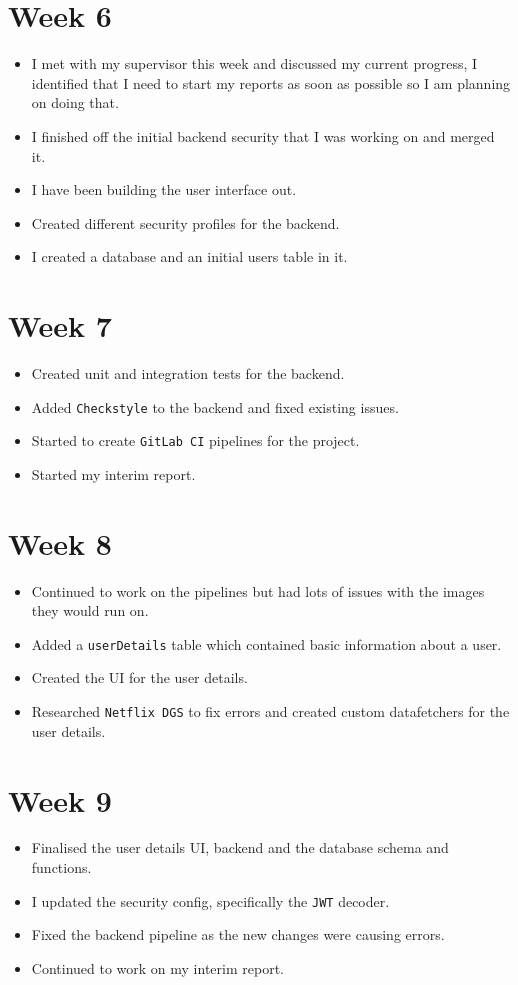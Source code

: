 \documentclass[]{project_report}
\begin{document}
\section{Week 6}
\begin{itemize}
    \item I met with my supervisor this week and discussed my current progress, I identified that I need to start my reports as soon as possible so I am planning on doing that.
    \item I finished off the initial backend security that I was working on and merged it.
    \item I have been building the user interface out.
    \item Created different security profiles for the backend.
    \item I created a database and an initial users table in it.
\end{itemize}

\section{Week 7}
\begin{itemize}
    \item Created unit and integration tests for the backend.
    \item Added \texttt{Checkstyle} to the backend and fixed existing issues.
    \item Started to create \texttt{GitLab CI} pipelines for the project.
    \item Started my interim report.
\end{itemize}

\section{Week 8}
\begin{itemize}
    \item Continued to work on the pipelines but had lots of issues with the images they would run on.
    \item Added a \texttt{userDetails} table which contained basic information about a user.
    \item Created the UI for the user details.
    \item Researched \texttt{Netflix DGS} to fix errors and created custom datafetchers for the user details.
\end{itemize}

\section{Week 9}
\begin{itemize}
    \item Finalised the user details UI, backend and the database schema and functions.
    \item I updated the security config, specifically the \texttt{JWT} decoder.
    \item Fixed the backend pipeline as the new changes were causing errors.
    \item Continued to work on my interim report.
\end{itemize}
\end{document}

